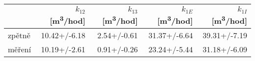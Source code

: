 \begin{tabular}{lrrrr}
\toprule
{} & $k_{12}$ [\si{m^3/hod}] & $k_{13}$ [\si{m^3/hod}] & $k_{1E}$ [\si{m^3/hod}] & $k_{1I}$ [\si{m^3/hod}] \\
\midrule
zpětně &            10.42+/-6.18 &             2.54+/-0.61 &            31.37+/-6.64 &            39.31+/-7.19 \\
měření &            10.19+/-2.61 &             0.91+/-0.26 &            23.24+/-5.44 &            31.18+/-6.09 \\
\bottomrule
\end{tabular}
